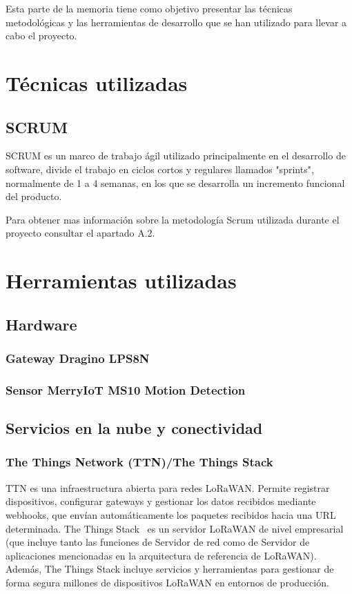 Esta parte de la memoria tiene como objetivo presentar las técnicas metodológicas y las herramientas de desarrollo que se han utilizado para llevar a cabo el proyecto.

\section{Técnicas utilizadas}
\subsection{SCRUM}
SCRUM es un marco de trabajo ágil utilizado principalmente en el desarrollo de software, divide el trabajo en ciclos cortos y regulares llamados "sprints", normalmente de 1 a 4 semanas, en los que se desarrolla un incremento funcional del producto.

Para obtener mas información sobre la metodología Scrum utilizada durante el proyecto consultar el apartado A.2.

\section{Herramientas utilizadas}
\subsection{Hardware}
\subsubsection{Gateway Dragino LPS8N}
\cite{Haw:Dra}
\subsubsection{Sensor MerryIoT MS10 Motion Detection}

\subsection{Servicios en la nube y conectividad}
\subsubsection{The Things Network (TTN)/The Things Stack}
TTN es una infraestructura abierta para redes LoRaWAN. Permite registrar dispositivos, configurar gateways y gestionar los datos recibidos mediante webhooks, que envían automáticamente los paquetes recibidos hacia una URL determinada.
The Things Stack~\cite{TTN:TTS} es un servidor LoRaWAN de nivel empresarial (que incluye tanto las funciones de Servidor de red como de Servidor de aplicaciones mencionadas en la arquitectura de referencia de LoRaWAN). Además, The Things Stack incluye servicios y herramientas para gestionar de forma segura millones de dispositivos LoRaWAN en entornos de producción.
